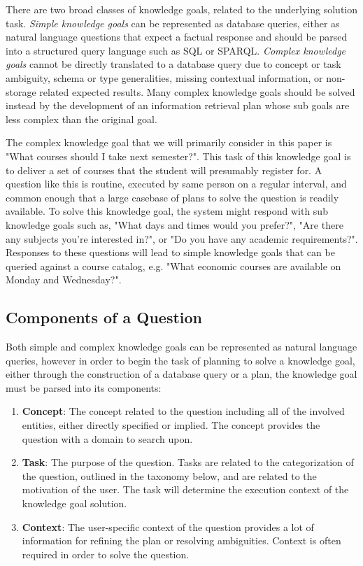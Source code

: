 \documentclass[11pt,letterpaper]{article}
\begin{document}
There are two broad classes of knowledge goals, related to the underlying solution task. \textit{Simple knowledge goals} can be represented as database queries, either as natural language questions that expect a factual response and should be parsed into a structured query language such as SQL or SPARQL. \textit{Complex knowledge goals} cannot be directly translated to a database query due to concept or task ambiguity, schema or type generalities, missing contextual information, or non-storage related expected results. Many complex knowledge goals should be solved instead by the development of an information retrieval plan whose sub goals are less complex than the original goal.

The complex knowledge goal that we will primarily consider in this paper is "What courses should I take next semester?". This task of this knowledge goal is to deliver a set of courses that the student will presumably register for. A question like this is routine, executed by same person on a regular interval, and common enough that a large casebase of plans to solve the question is readily available. To solve this knowledge goal, the system might respond with sub knowledge goals such as, "What days and times would you prefer?", "Are there any subjects you're interested in?", or "Do you have any academic requirements?". Responses to these questions will lead to simple knowledge goals that can be queried against a course catalog, e.g. "What economic courses are available on Monday and Wednesday?".

\subsection{Components of a Question}

Both simple and complex knowledge goals can be represented as natural language queries, however in order to begin the task of planning to solve a knowledge goal, either through the construction of a database query or a plan, the knowledge goal must be parsed into its components:

\begin{enumerate}
\item \textbf{Concept}: The concept related to the question including all of the involved entities, either directly specified or implied. The concept provides the question with a domain to search upon.
\item \textbf{Task}: The purpose of the question. Tasks are related to the categorization of the question, outlined in the taxonomy below, and are related to the motivation of the user. The task will determine the execution context of the knowledge goal solution.
\item \textbf{Context}: The user-specific context of the question provides a lot of information for refining the plan or resolving ambiguities. Context is often required in order to solve the question.
\end{enumerate}
\end{document}
